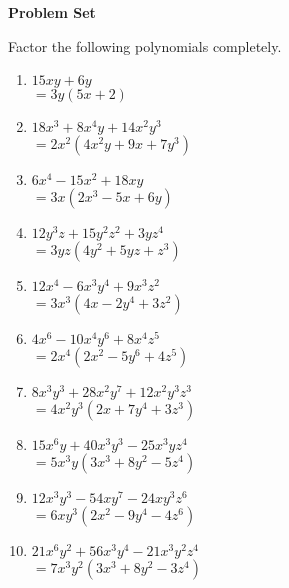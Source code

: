 \textbf{Problem Set}

\vspce

Factor the following polynomials completely.  
\begin{enumerate}

\item \hspce  $15xy + 6y$\\
$= 3 y \left(5 x + 2\right)$

\item \hspce $18x^{3} + 8x^{4}y + 14x^{2}y^{3}$\\
$= 2 x^{2} \left(4 x^{2} y + 9 x + 7 y^{3}\right)$

\item \hspce $6x^{4} - 15x^{2} + 18xy$\\
$= 3 x \left(2 x^{3} - 5 x + 6 y\right)$

\item \hspce $12y^{3}z + 15y^{2}z^{2} + 3yz^{4}$\\
$= 3 y z \left(4 y^{2} + 5 y z + z^{3}\right) $

\item \hspce $12 x^{4} - 6 x^{3} y^{4} + 9 x^{3} z^{2}$\\
$= 3 x^{3} \left(4 x - 2 y^{4} + 3 z^{2}\right)$


\item \hspce $4 x^{6} - 10 x^{4} y^{6} + 8 x^{4} z^{5}$\\
$= 2 x^{4} \left(2 x^{2} - 5 y^{6} + 4 z^{5}\right)$


\item \hspce $8 x^{3} y^{3} + 28 x^{2} y^{7} + 12 x^{2} y^{3} z^{3}$\\
$= 4 x^{2} y^{3} \left(2 x + 7 y^{4} + 3 z^{3}\right)$


\item \hspce $15 x^{6} y + 40 x^{3} y^{3} - 25 x^{3} y z^{4}$\\
$= 5 x^{3} y \left(3 x^{3} + 8 y^{2} - 5 z^{4}\right)$


\item \hspce $12 x^{3} y^{3} - 54 x y^{7} - 24 x y^{3} z^{6}$\\
$= 6 x y^{3} \left(2 x^{2} - 9 y^{4} - 4 z^{6}\right)$


\item \hspce $21 x^{6} y^{2} + 56 x^{3} y^{4} - 21 x^{3} y^{2} z^{4}$\\
$= 7 x^{3} y^{2} \left(3 x^{3} + 8 y^{2} - 3 z^{4}\right)$

\end{enumerate}